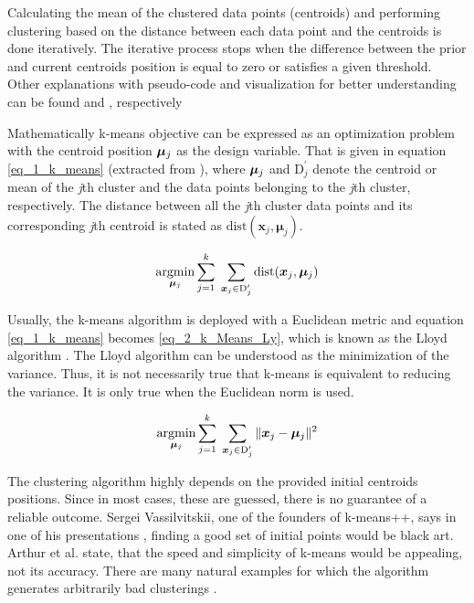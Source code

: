 Calculating the mean of the clustered 
data points (centroids) and performing clustering based on the 
distance between each data point and the centroids 
is done iteratively. The iterative process stops when 
the difference between the prior and current 
centroids position is equal to zero or 
satisfies a given threshold. Other explanations with pseudo-code and  
visualization for better understanding can be found\cite{Frochte2020} 
and \cite{Sergei_Visual}, respectively\newline

Mathematically k-means objective can be expressed 
as an optimization problem with the centroid 
position $\bm{\mu_}j$ as the design variable. That is given in equation
\eqref{eq_1_k_means} (extracted from \cite{Frochte2020}), where 
$\bm{\mu_}j$ and  $\mathrm{D}^{\prime}_j$ denote the centroid or 
mean of the \emph{j}th cluster and the data points 
belonging to the \emph{j}th cluster, respectively.
The distance between all the \emph{j}th cluster data points 
and its corresponding \emph{j}th centroid is 
stated as $\mathrm{dist}(\bm{x}_j, \bm{\mu}_j)$.

\begin{equation}
    \label{eq_1_k_means}
    \operatorname*{argmin}_{\bm{\mu}_j}\sum_{j=1}^k \; \sum_{\bm{x}_j \in \mathrm{D}^{\prime}_j }
    \mathrm{dist}(\bm{x}_j, \bm \mu_j)
\end{equation}

Usually, the k-means algorithm is deployed with a Euclidean metric 
and equation \eqref{eq_1_k_means} becomes \eqref{eq_2_k_Means_Ly}, which
is known as the Lloyd algorithm \cite{Frochte2020, Lloyd1982}. The
Lloyd algorithm can be understood as the minimization of the variance.
Thus, it is not necessarily true that k-means is equivalent to reducing 
the variance. It is only true when the Euclidean norm is used.

\begin{equation}
    \label{eq_2_k_Means_Ly}
    \operatorname*{argmin}_{\bm{\mu}_j}\sum_{j=1}^k \; \sum_{\bm{x}_j \in \mathrm{D}^{\prime}_j }
    \| \bm x_j - \bm \mu_j \|^2
\end{equation}

The clustering algorithm highly depends on the provided 
initial centroids positions. Since in most cases, these 
are guessed, there is no guarantee of a reliable outcome.
Sergei Vassilvitskii, one of the founders of 
k-means++, says in one of his presentations \cite{Sergei_Black_Art},
finding a good set of initial points would be black art.
Arthur et al. \cite{Arthur2006} state,
that the speed and simplicity of k-means would be appealing, not 
its accuracy. There are many natural examples for which 
the algorithm generates arbitrarily bad clusterings \cite{Arthur2006}.\newline 


